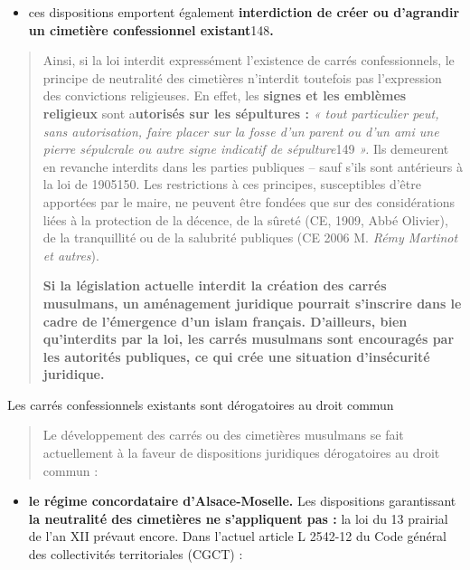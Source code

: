 \begin{itemize}
\item
  ces dispositions emportent également \textbf{interdiction de créer ou
  d'agrandir un cimetière confessionnel existant}148\textbf{.}
\end{itemize}

\begin{quote}
Ainsi, si la loi interdit expressément l'existence de carrés
confessionnels, le principe de neutralité des cimetières n'interdit
toutefois pas l'expression des convictions religieuses. En effet, les
\textbf{signes et les emblèmes religieux} sont a\textbf{utorisés sur les
sépultures :} \emph{« tout particulier peut, sans autorisation, faire
placer sur la fosse d'un parent ou d'un ami une pierre sépulcrale ou
autre signe indicatif de sépulture}149 \emph{».} Ils demeurent en
revanche interdits dans les parties publiques -- sauf s'ils sont
antérieurs à la loi de 1905150. Les restrictions à ces principes,
susceptibles d'être apportées par le maire, ne peuvent être fondées que
sur des considérations liées à la protection de la décence, de la sûreté
(CE, 1909, Abbé Olivier), de la tranquillité ou de la salubrité
publiques (CE 2006 M. \emph{Rémy Martinot et autres}).

\textbf{Si la législation actuelle interdit la création des carrés
musulmans, un aménagement juridique pourrait s'inscrire dans le cadre de
l'émergence d'un islam français. D'ailleurs, bien qu'interdits par la
loi, les carrés musulmans sont encouragés par les autorités publiques,
ce qui crée une situation d'insécurité juridique.}
\end{quote}

Les carrés confessionnels existants sont dérogatoires au droit commun

\begin{quote}
Le développement des carrés ou des cimetières musulmans se fait
actuellement à la faveur de dispositions juridiques dérogatoires au
droit commun :
\end{quote}

\begin{itemize}
\item
  \textbf{le régime concordataire d'Alsace-Moselle.} Les dispositions
  garantissant \textbf{la neutralité des cimetières ne s'appliquent pas
  :} la loi du 13 prairial de l'an XII prévaut encore. Dans l'actuel
  article L 2542-12 du Code général des collectivités territoriales
  (CGCT) :
\end{itemize}

